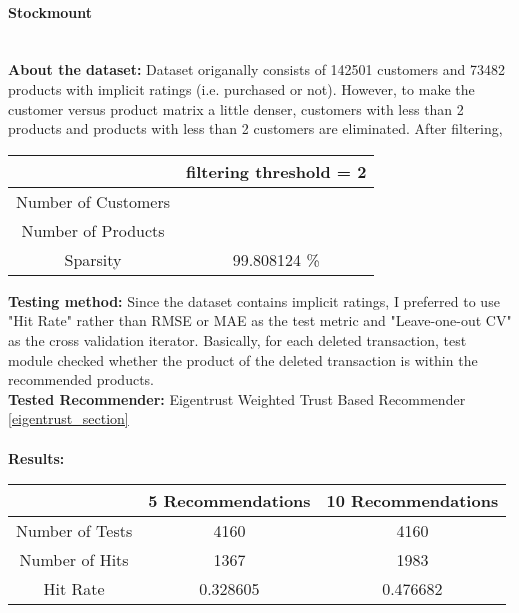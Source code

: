 	\paragraph{Stockmount} \mbox{}\\
	\textbf{About the dataset:} Dataset origanally consists of 142501 customers and 73482 products with implicit ratings (i.e. purchased or not). However, to make the customer versus product matrix a little denser, customers with less than 2 products and products with less than 2 customers are eliminated. After filtering,
	\begin{center}
		\begin{tabular}{ | c | c |}
			\hline
			& filtering threshold = 2\\ 
			\hline
			Number of Customers & \\  
			\hline
			Number of Products & \\  
			\hline
			Sparsity & 99.808124 \% \\   
			\hline
		\end{tabular}
	\end{center} 
	\vspace{0.5cm}
	\textbf{Testing method:} Since the dataset contains implicit ratings, I preferred to use "Hit Rate" rather than RMSE or MAE as the test metric and "Leave-one-out CV" as the cross validation iterator. Basically, for each deleted transaction, test module checked whether the product of the deleted transaction is within the recommended products.\\
	\textbf{Tested Recommender:} Eigentrust Weighted Trust Based Recommender \ref{eigentrust_section} \\ \\
	\textbf{Results:}
	\begin{center}
		\begin{tabular}{ | c | c | c |}
			\hline
			& 5 Recommendations & 10 Recommendations\\ 
			\hline
			Number of Tests&  4160 & 4160\\  
			\hline
			Number of Hits&  1367 & 1983\\  
			\hline
			Hit Rate &   0.328605 & 0.476682\\  
			\hline
		\end{tabular}
	\end{center} 

